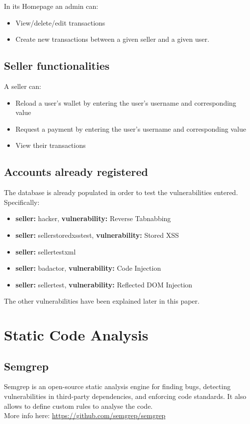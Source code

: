\documentclass[]{article}
\begin{document}
In its Homepage an admin can:
\begin{itemize}
    \item View/delete/edit transactions
    \item Create new transactions between a given seller and a given user. 
\end{itemize}

\subsection{Seller functionalities}
A seller can:
\begin{itemize}
    \item Reload a user's wallet by entering the user's username and corresponding value
    \item Request a payment by entering the user's username and corresponding value
    \item View their transactions 
\end{itemize}

\subsection{Accounts already registered}
The database is already populated in order to test the vulnerabilities entered. Specifically:
\begin{itemize}
    \item \textbf{seller:} hacker, \textbf{vulnerability:} Reverse Tabnabbing
    \item \textbf{seller:} sellerstoredxsstest, \textbf{vulnerability:} Stored XSS
    \item \textbf{seller:} sellertestxml
    \item \textbf{seller:} badactor, \textbf{vulnerability:} Code Injection 
    \item \textbf{seller:} sellertest, \textbf{vulnerability:} Reflected DOM Injection
\end{itemize}
The other vulnerabilities have been explained later in this paper.

\newpage

\section{Static Code Analysis}

\subsection{Semgrep}
Semgrep is an open-source static analysis engine for finding bugs, detecting vulnerabilities in third-party dependencies, 
and enforcing code standards. It also allows to define custom rules to analyse the code.\\
More info here: \footnotesize\url{https://github.com/semgrep/semgrep}
\normalsize
\end{document}
